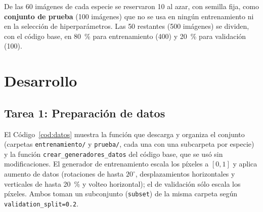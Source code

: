 \documentclass[11pt,letterpaper]{article}
\begin{document}
De las 60 imágenes de cada especie se reservaron 10 al azar, con semilla fija, como \textbf{conjunto de prueba} (100 imágenes) que no se usa en ningún entrenamiento ni en la selección de hiperparámetros. Las 50 restantes (500 imágenes) se dividen, con el código base, en 80~\% para entrenamiento (400) y 20~\% para validación (100).

\section{Desarrollo}

\subsection{Tarea 1: Preparación de datos}

El Código~\ref{cod:datos} muestra la función que descarga y organiza el conjunto (carpetas \texttt{entrenamiento/} y \texttt{prueba/}, cada una con una subcarpeta por especie) y la función \texttt{crear\_generadores\_datos} del código base, que se usó sin modificaciones. El generador de entrenamiento escala los píxeles a $[0, 1]$ y aplica aumento de datos (rotaciones de hasta $20^{\circ}$, desplazamientos horizontales y verticales de hasta 20~\% y volteo horizontal); el de validación sólo escala los píxeles. Ambos toman un subconjunto (\texttt{subset}) de la misma carpeta según \texttt{validation\_split=0.2}.
\end{document}
